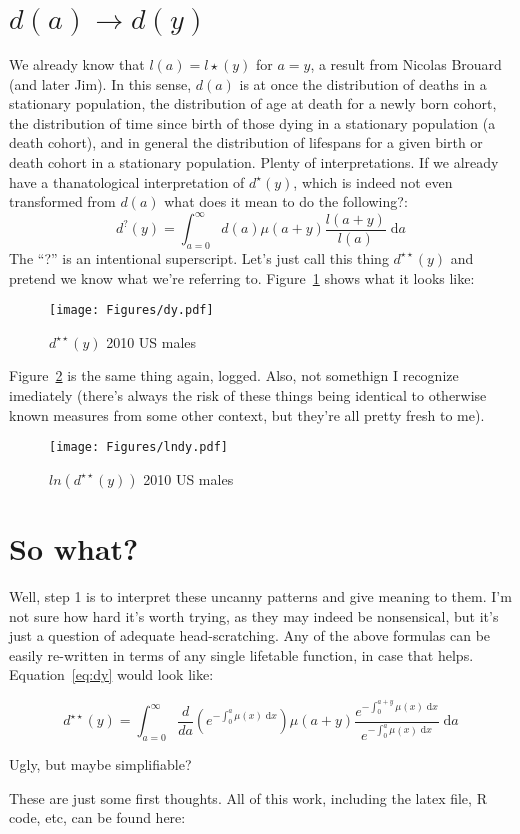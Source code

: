 \documentclass{article}
\newcommand{\dd}{\; \mathrm{d}}
\begin{document}
\section{$d(a) \rightarrow d(y)$}
We already know that $l(a) = l\star(y)$ for $a=y$, a result from Nicolas Brouard
(and later Jim). In this sense, $d(a)$ is at once the distribution of deaths in
a stationary population, the distribution of age at death for a newly born
cohort, the distribution of time since birth of those dying in a stationary
population (a death cohort), and in general the distribution of lifespans for a
given birth or death cohort in a stationary population. Plenty of
interpretations. If we already have a thanatological interpretation of
$d^\star(y)$, which is indeed not even transformed from $d(a)$ what does it mean
to do the following?:
\begin{equation}
\label{eq:dy}
d^{?}(y) = \int _{a=0}^\infty d(a)\mu(a+y)\frac{l(a+y)}{l(a)} \dd a
\end{equation}
The ``?'' is an intentional superscript. Let's just call this
thing $d^{\star\star}(y)$ and pretend we know what we're referring to.
Figure~\ref{fig:dy} shows what it looks like:

\begin{figure}[ht!]
\caption{$d^{\star\star}(y)$ 2010 US males}
\label{fig:dy}
\texttt{[image: Figures/dy.pdf]}
\end{figure}

Figure~\ref{fig:lndy} is the same thing again, logged. Also, not somethign I
recognize imediately (there's always the risk of these things being identical
to otherwise known measures from some other context, but they're all pretty
fresh to me).

\begin{figure}[ht!]
\caption{$ln(d^{\star\star}(y))$ 2010 US males}
\label{fig:lndy}
\texttt{[image: Figures/lndy.pdf]}
\end{figure}

\section{So what?}
Well, step 1 is to interpret these uncanny patterns and give meaning to them.
I'm not sure how hard it's worth trying, as they may indeed be nonsensical, but
it's just a question of adequate head-scratching. Any of the above formulas can
be easily re-written in terms of any single lifetable function, in case that
helps. Equation~\eqref{eq:dy} would look like:

\begin{equation}
\label{eq:dymu}
d^{\star\star}(y) = \int _{a=0}^\infty
\frac{d}{da}\left(e^{-\int_{0}^{a}\mu(x)\dd
x}\right)\mu(a+y)\frac{e^{-\int_{0}^{a+y}\mu(x)\dd x}}{e^{-\int_{0}^{a}\mu(x)\dd
x}}\dd a
\end{equation}

Ugly, but maybe simplifiable? 

These are just some first thoughts. All of this work, including the latex file,
R code, etc, can be found here:
\end{document}
